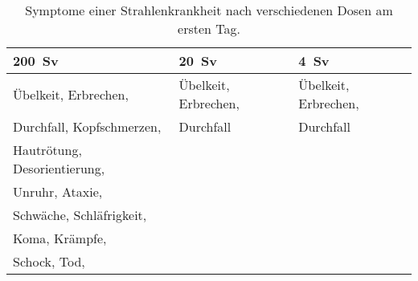 \begin{table}
	\caption{Symptome einer Strahlenkrankheit nach verschiedenen Dosen am ersten Tag.\cite{AnnuRev18_2}}
	\begin{tabular}{lll}
		\toprule
 		\SI{200}{\sievert} & \SI{20}{\sievert}& \SI{4}{\sievert}\\
		\midrule
 			 Übelkeit, Erbrechen, 				& Übelkeit, Erbrechen,& Übelkeit, Erbrechen,\\
		 	 Durchfall,  Kopfschmerzen, 	& Durchfall  					& Durchfall						\\
		 	 Hautrötung, Desorientierung,	&\phantom{Hautrötung, Desorientierung,} 										&											\\
		 	 Unruhr, Ataxie,							& 										&\phantom{Hautrötung, Desorientierung,}  										\\
		 	 Schwäche, Schläfrigkeit, 		&  										&  										\\
			 Koma, Krämpfe,								&											&											\\
			 Schock, Tod,									&											&											\\
	\end{tabular}
\end{table}
